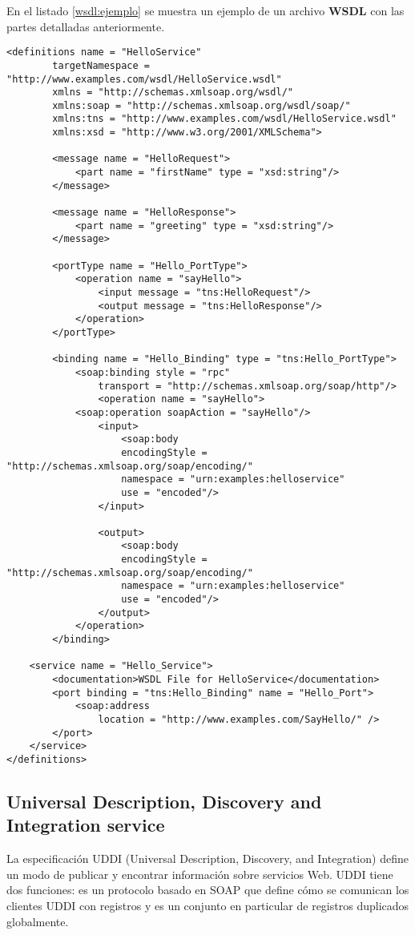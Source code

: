 En el listado \ref{wsdl:ejemplo} se muestra un ejemplo de un archivo \textbf{WSDL} con las partes detalladas anteriormente.

 \begin{lstlisting}[label=wsdl:ejemplo, caption= Ejemplo de un mensaje WSDL. Tomado de \WC]
	<definitions name = "HelloService"
		targetNamespace = "http://www.examples.com/wsdl/HelloService.wsdl"
		xmlns = "http://schemas.xmlsoap.org/wsdl/"
		xmlns:soap = "http://schemas.xmlsoap.org/wsdl/soap/"
		xmlns:tns = "http://www.examples.com/wsdl/HelloService.wsdl"
		xmlns:xsd = "http://www.w3.org/2001/XMLSchema">

		<message name = "HelloRequest">
			<part name = "firstName" type = "xsd:string"/>
		</message>

		<message name = "HelloResponse">
			<part name = "greeting" type = "xsd:string"/>
		</message>

		<portType name = "Hello_PortType">
			<operation name = "sayHello">
				<input message = "tns:HelloRequest"/>
				<output message = "tns:HelloResponse"/>
			</operation>
		</portType>

		<binding name = "Hello_Binding" type = "tns:Hello_PortType">
			<soap:binding style = "rpc"
				transport = "http://schemas.xmlsoap.org/soap/http"/>
				<operation name = "sayHello">
			<soap:operation soapAction = "sayHello"/>
				<input>
					<soap:body
					encodingStyle = "http://schemas.xmlsoap.org/soap/encoding/"
					namespace = "urn:examples:helloservice"
					use = "encoded"/>
				</input>
	
				<output>
					<soap:body
					encodingStyle = "http://schemas.xmlsoap.org/soap/encoding/"
					namespace = "urn:examples:helloservice"
					use = "encoded"/>
				</output>
	    	</operation>
		</binding>

	<service name = "Hello_Service">
		<documentation>WSDL File for HelloService</documentation>
		<port binding = "tns:Hello_Binding" name = "Hello_Port">
			<soap:address
				location = "http://www.examples.com/SayHello/" />
		</port>
	</service>
</definitions>
 \end{lstlisting}
  



 	\subsection{Universal Description, Discovery and Integration service } 
   
  La especificación UDDI (Universal Description, Discovery, and Integration) define un modo de publicar y encontrar información sobre servicios Web. UDDI tiene dos funciones:  es un protocolo basado en SOAP que define cómo se comunican los clientes UDDI con registros y   es un conjunto en particular de registros duplicados globalmente.
  
